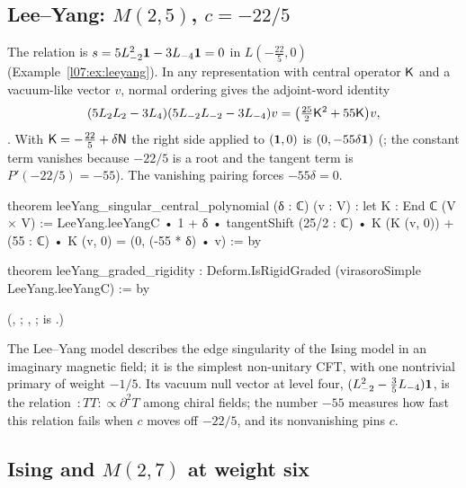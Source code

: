 \subsection{Lee--Yang: \texorpdfstring{$M(2,5)$, $c = -22/5$}{M(2,5), c = -22/5}}\label{l07:sec:leeyang}

The relation is $s = 5L_{-2}^2\mathbf{1} - 3L_{-4}\mathbf{1} = 0$ in $L(-\frac{22}5,0)$
(Example~\ref{l07:ex:leeyang}). In any representation with central operator $\mathsf{K}$ and a vacuum-like vector
$v$, normal ordering gives the adjoint-word identity
\begin{equation*}
 (5L_2L_2 - 3L_4)(5L_{-2}L_{-2} - 3L_{-4})v = \big(\tfrac{25}{2}\mathsf{K}^2 + 55\mathsf{K}\big)v,
\end{equation*}
. With $\mathsf{K} = -\frac{22}5 + \delta\mathsf{N}$ the right side applied to
$(\mathbf{1},0)$ is $(0,-55\delta\mathbf{1})$ (; the constant term
vanishes because $-22/5$ is a root and the tangent term is $P'(-22/5) = -55$). The vanishing pairing
forces $-55\delta = 0$.
\begin{leancode}
theorem leeYang_singular_central_polynomial (δ : ℂ) (v : V) :
    let K : End ℂ (V × V) := LeeYang.leeYangC • 1 + δ • tangentShift
    (25/2 : ℂ) • K (K (v, 0)) + (55 : ℂ) • K (v, 0) =
      (0, (-55 * δ) • v) := by

theorem leeYang_graded_rigidity : Deform.IsRigidGraded (virasoroSimple LeeYang.leeYangC) := by
\end{leancode}
(,
;
, ;
 is .)


\begin{physics}
The Lee--Yang model describes the edge singularity of the Ising model in an imaginary magnetic field; it is the
simplest non-unitary CFT, with one nontrivial primary of weight $-1/5$. Its vacuum null vector at level four,
$(L_{-2}^2-\frac35L_{-4})\mathbf{1}$, is the relation $\,{:}TT{:}\propto\partial^2T$ among chiral fields; the number $-55$
measures how fast this relation fails when $c$ moves off $-22/5$, and its nonvanishing pins $c$.
\end{physics}

\subsection{Ising and \texorpdfstring{$M(2,7)$}{M(2,7)} at weight six}


